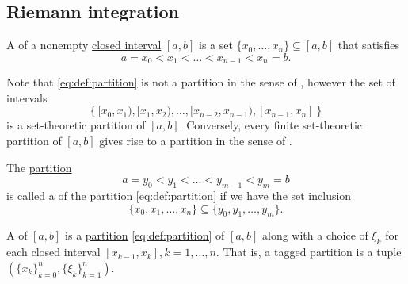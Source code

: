 \subsection{Riemann integration}\label{subsec:riemann_integration}

\begin{definition}\label{def:partition}
  A  of a nonempty \hyperref[def:total_order_interval/closed]{closed interval} \( [a, b] \) is a set \( \{ x_0, \ldots, x_n \} \subseteq [a, b] \) that satisfies
  \begin{equation}\label{eq:def:partition}
    a = x_0 < x_1 < \ldots < x_{n-1} < x_n = b.
  \end{equation}
\end{definition}

\begin{remark}\label{remark:set_and_interval_partitions}
  Note that \eqref{eq:def:partition} is not a partition in the sense of , however the set of intervals
  \begin{equation*}
    \left\{ [x_0, x_1), [x_1, x_2), \ldots, [x_{n-2}, x_{n-1}), [x_{n-1}, x_n] \right\}
  \end{equation*}
  is a set-theoretic partition of \( [a, b] \). Conversely, every finite set-theoretic partition of \( [a, b] \) gives rise to a partition in the sense of .
\end{remark}

\begin{definition}\label{def:partition_refinement}
  The \hyperref[def:partition]{partition}
  \begin{equation*}
    a = y_0 < y_1 < \ldots < y_{m-1} < y_m = b
  \end{equation*}
  is called a  of the partition \eqref{eq:def:partition} if we have the \hyperref[def:subset]{set inclusion}
  \begin{equation*}
    \{ x_0, x_1, \ldots, x_n \} \subseteq \{ y_0, y_1, \ldots, y_m \}.
  \end{equation*}
\end{definition}

\begin{definition}\label{def:tagged_partition}
  A  of \( [a, b] \) is a \hyperref[def:partition]{partition} \eqref{eq:def:partition} of \( [a, b] \) along with a choice of \( \xi_k \) for each closed interval \( [x_{k-1}, x_k], k = 1, \ldots, n \). That is, a tagged partition is a tuple \( (\{ x_k \}_{k=0}^n, \{ \xi_k \}_{k=1}^n) \).
\end{definition}
